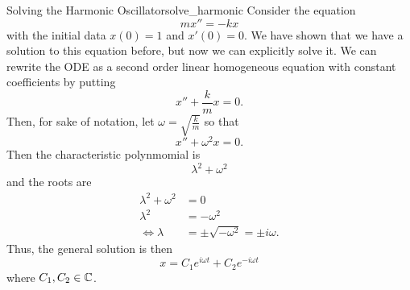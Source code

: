         \begin{ex}{Solving the Harmonic Oscillator}{solve_harmonic}
        Consider the equation
        \[
        mx''=-kx
        \]
        with the initial data $x(0)=1$ and $x'(0)=0$. We have shown that we have a solution to this equation before, but now we can explicitly solve it.  We can rewrite the ODE as a second order linear homogeneous equation with constant coefficients by putting
        \[
        x''+\frac{k}{m}x=0.
        \]
        Then, for sake of notation, let $\omega = \sqrt{\frac{k}{m}}$ so that
        \[
        x''+\omega^2x=0.
        \]
        Then the characteristic polynmomial is
        \[
        \lambda^2+\omega^2
        \]
        and the roots are
        \begin{align*}
            \lambda^2+\omega^2&=0\\
            \lambda^2&=-\omega^2\\
            \iff \lambda&= \pm \sqrt{-\omega^2}= \pm i \omega.
        \end{align*}
        Thus, the general solution is then
        \[
        x=C_1 e^{i\omega t}+C_2e^{-i\omega t}
        \]
        where $C_1,C_2\in \mathbb{C}$.
        

\end{ex}
